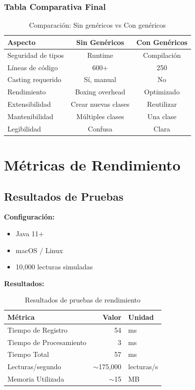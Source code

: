 \documentclass[12pt,a4paper]{article}
\begin{document}
\subsubsection{Tabla Comparativa Final}

\begin{table}[h]
\centering
\small
\begin{tabular}{|l|c|c|}
\hline
\rowcolor{agrogreen!20}
\textbf{Aspecto} & \textbf{Sin Genéricos} & \textbf{Con Genéricos} \\
\hline
Seguridad de tipos & Runtime & Compilación \\
Líneas de código & 600+ & 250 \\
Casting requerido & Sí, manual & No \\
Rendimiento & Boxing overhead & Optimizado \\
Extensibilidad & Crear nuevas clases & Reutilizar \\
Mantenibilidad & Múltiples clases & Una clase \\
Legibilidad & Confusa & Clara \\
\hline
\end{tabular}
\caption{Comparación: Sin genéricos vs Con genéricos}
\label{tab:comparacion-genericos}
\end{table}


\section{Métricas de Rendimiento}

\subsection{Resultados de Pruebas}

\textbf{Configuración:}
\begin{itemize}
    \item Java 11+
    \item macOS / Linux
    \item 10,000 lecturas simuladas
\end{itemize}

\textbf{Resultados:}

\begin{table}[h]
\centering
\begin{tabular}{|l|r|l|}
\hline
\rowcolor{agrogreen!20}
\textbf{Métrica} & \textbf{Valor} & \textbf{Unidad} \\
\hline
Tiempo de Registro & 54 & ms \\
Tiempo de Procesamiento & 3 & ms \\
Tiempo Total & 57 & ms \\
Lecturas/segundo & $\sim$175,000 & lecturas/s \\
Memoria Utilizada & $\sim$15 & MB \\
\hline
\end{tabular}
\caption{Resultados de pruebas de rendimiento}
\label{tab:resultados-rendimiento}
\end{table}
\end{document}
